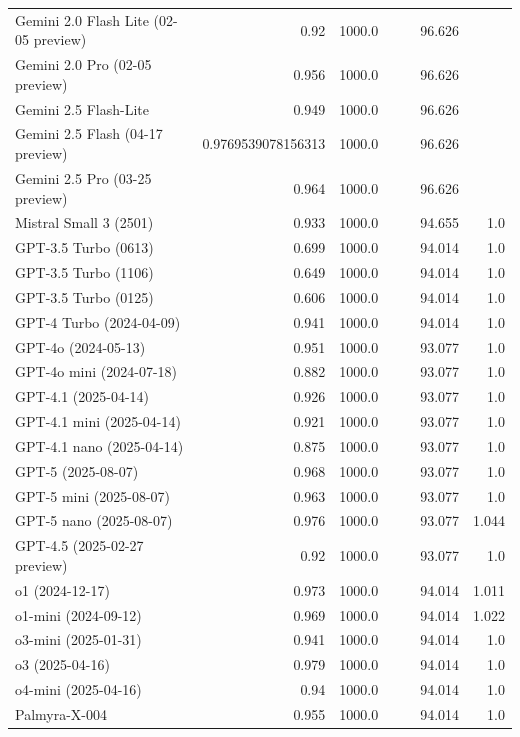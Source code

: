 \begin{table}[htp]
{\begin{tabular}{lrrrrrr}
Gemini 2.0 Flash Lite (02-05 preview) & 0.92 & 1000.0 &  &  & 96.626 &  \\
Gemini 2.0 Pro (02-05 preview) & 0.956 & 1000.0 &  &  & 96.626 &  \\
Gemini 2.5 Flash-Lite & 0.949 & 1000.0 &  &  & 96.626 &  \\
Gemini 2.5 Flash (04-17 preview) & 0.9769539078156313 & 1000.0 &  &  & 96.626 &  \\
Gemini 2.5 Pro (03-25 preview) & 0.964 & 1000.0 &  &  & 96.626 &  \\
Mistral Small 3 (2501) & 0.933 & 1000.0 &  &  & 94.655 & 1.0 \\
GPT-3.5 Turbo (0613) & 0.699 & 1000.0 &  &  & 94.014 & 1.0 \\
GPT-3.5 Turbo (1106) & 0.649 & 1000.0 &  &  & 94.014 & 1.0 \\
GPT-3.5 Turbo (0125) & 0.606 & 1000.0 &  &  & 94.014 & 1.0 \\
GPT-4 Turbo (2024-04-09) & 0.941 & 1000.0 &  &  & 94.014 & 1.0 \\
GPT-4o (2024-05-13) & 0.951 & 1000.0 &  &  & 93.077 & 1.0 \\
GPT-4o mini (2024-07-18) & 0.882 & 1000.0 &  &  & 93.077 & 1.0 \\
GPT-4.1 (2025-04-14) & 0.926 & 1000.0 &  &  & 93.077 & 1.0 \\
GPT-4.1 mini (2025-04-14) & 0.921 & 1000.0 &  &  & 93.077 & 1.0 \\
GPT-4.1 nano (2025-04-14) & 0.875 & 1000.0 &  &  & 93.077 & 1.0 \\
GPT-5 (2025-08-07) & 0.968 & 1000.0 &  &  & 93.077 & 1.0 \\
GPT-5 mini (2025-08-07) & 0.963 & 1000.0 &  &  & 93.077 & 1.0 \\
GPT-5 nano (2025-08-07) & 0.976 & 1000.0 &  &  & 93.077 & 1.044 \\
GPT-4.5 (2025-02-27 preview) & 0.92 & 1000.0 &  &  & 93.077 & 1.0 \\
o1 (2024-12-17) & 0.973 & 1000.0 &  &  & 94.014 & 1.011 \\
o1-mini (2024-09-12) & 0.969 & 1000.0 &  &  & 94.014 & 1.022 \\
o3-mini (2025-01-31) & 0.941 & 1000.0 &  &  & 94.014 & 1.0 \\
o3 (2025-04-16) & 0.979 & 1000.0 &  &  & 94.014 & 1.0 \\
o4-mini (2025-04-16) & 0.94 & 1000.0 &  &  & 94.014 & 1.0 \\
Palmyra-X-004 & 0.955 & 1000.0 &  &  & 94.014 & 1.0 \\

\end{tabular}}
\end{table}
